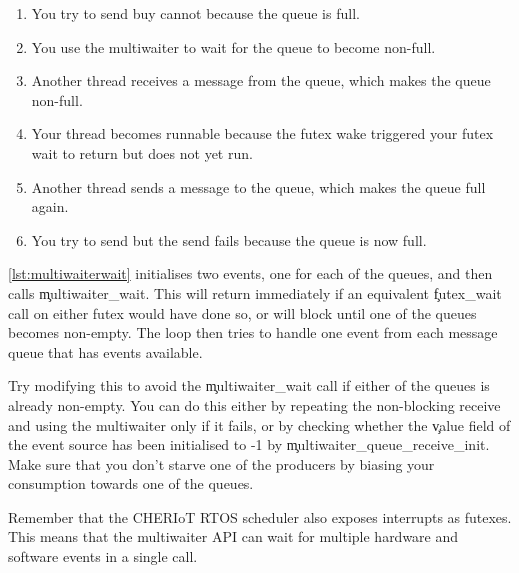 \begin{enumerate}
       \item{You try to send buy cannot because the queue is full.}
       \item{You use the multiwaiter to wait for the queue to become non-full.}
       \item{Another thread receives a message from the queue, which makes the queue non-full.}
       \item{Your thread becomes runnable because the futex wake triggered your futex wait to return but does not yet run.}
       \item{Another thread sends a message to the queue, which makes the queue full again.}
       \item{You try to send but the send fails because the queue is now full.}
\end{enumerate}

\ref{lst:multiwaiterwait} initialises two events, one for each of the queues, and then calls \c{multiwaiter_wait}.
This will return immediately if an equivalent \c{futex_wait} call on either futex would have done so, or will block until one of the queues becomes non-empty.
The loop then tries to handle one event from each message queue that has events available.

\codelisting[filename=examples/multiwaiter/queue.cc,marker=multiwaiter_use,label=lst:multiwaiterwait,caption="Using a multiwaiter to wait for either of two queues."]{}

Try modifying this to avoid the \c{multiwaiter_wait} call if either of the queues is already non-empty.
You can do this either by repeating the non-blocking receive and using the multiwaiter only if it fails, or by checking whether the \c{value} field of the event source has been initialised to -1 by \c{multiwaiter_queue_receive_init}.
Make sure that you don't starve one of the producers by biasing your consumption towards one of the queues.

Remember that the CHERIoT RTOS scheduler also exposes interrupts as futexes.
This means that the multiwaiter API can wait for multiple hardware and software events in a single call.
